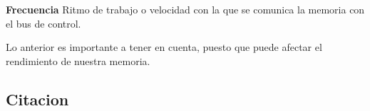 \documentclass{article}
\begin{document}
\begin{tcolorbox}[colupper=red!75!black]
	\textbf{Frecuencia}
	\tcblower
    Ritmo de trabajo o velocidad con la que se comunica la memoria con el bus de control.
\end{tcolorbox}
    Lo anterior es importante a tener en cuenta, puesto que puede afectar el rendimiento de nuestra memoria.
    
\subsection{Citacion}


\end{document}
